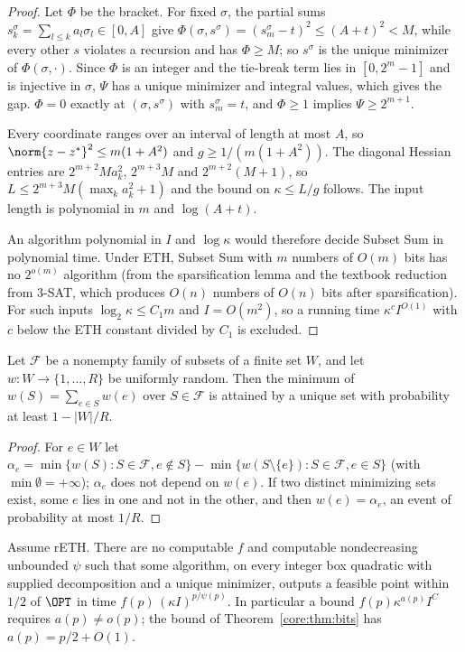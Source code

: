 \begin{proof}
Let $\Phi$ be the bracket. For fixed $\sigma$, the partial sums
$s^\sigma_k=\sum_{l\le k}a_l\sigma_l\in[0,A]$ give
$\Phi(\sigma,s^\sigma)=(s^\sigma_m-t)^2\le(A+t)^2<M$, while every other $s$
violates a recursion and has $\Phi\ge M$; so $s^\sigma$ is the unique minimizer
of $\Phi(\sigma,\cdot)$. Since $\Phi$ is an integer and the tie-break term lies
in $[0,2^m-1]$ and is injective in $\sigma$, $\Psi$ has a unique minimizer and
integral values, which gives the gap. $\Phi=0$ exactly at $(\sigma,s^\sigma)$
with $s^\sigma_m=t$, and $\Phi\ge1$ implies $\Psi\ge2^{m+1}$.

Every coordinate ranges over an interval of length at most $A$, so
$\norm{z-z^*}^2\le m(1+A^2)$ and $g\ge1/(m(1+A^2))$. The diagonal Hessian
entries are $2^{m+2}Ma_k^2$, $2^{m+3}M$ and $2^{m+2}(M+1)$, so
$L\le2^{m+3}M(\max_ka_k^2+1)$ and the bound on $\kappa\le L/g$ follows. The
input length is polynomial in $m$ and $\log(A+t)$.

An algorithm polynomial in $I$ and $\log\kappa$ would therefore decide Subset
Sum in polynomial time. Under ETH, Subset Sum with $m$ numbers of $O(m)$ bits
has no $2^{o(m)}$ algorithm (from the sparsification lemma
\cite{ImpagliazzoPaturiZane2001} and the textbook reduction from 3-SAT, which
produces $O(n)$ numbers of $O(n)$ bits after sparsification). For such inputs
$\log_2\kappa\le C_1m$ and $I=O(m^2)$, so a running time $\kappa^cI^{O(1)}$
with $c$ below the ETH constant divided by $C_1$ is excluded.
\end{proof}

\begin{lemma}\label{core:lem:isolation}
Let $\mathcal F$ be a nonempty family of subsets of a finite set $W$, and let
$w:W\to\{1,\dots,R\}$ be uniformly random. Then the minimum of
$w(S)=\sum_{e\in S}w(e)$ over $S\in\mathcal F$ is attained by a unique set with
probability at least $1-|W|/R$.
\end{lemma}

\begin{proof}
For $e\in W$ let $\alpha_e=\min\{w(S):S\in\mathcal F,e\notin S\}
-\min\{w(S\setminus\{e\}):S\in\mathcal F,e\in S\}$ (with
$\min\emptyset=+\infty$); $\alpha_e$ does not depend on $w(e)$. If two
distinct minimizing sets exist, some $e$ lies in one and not in the other,
and then $w(e)=\alpha_e$, an event of probability at most $1/R$.
\end{proof}

\begin{proposition}
\label{core:prop:lbproduct}
Assume rETH. There are no computable $f$ and computable nondecreasing
unbounded $\psi$ such that some algorithm, on every integer box quadratic with
supplied decomposition and a unique minimizer, outputs a feasible point within
$1/2$ of $\OPT$ in time $f(p)\,(\kappa I)^{p/\psi(p)}$. In particular a bound
$f(p)\kappa^{a(p)}I^{C}$ requires $a(p)\ne o(p)$; the bound of
Theorem~\ref{core:thm:bits} has $a(p)=p/2+O(1)$.
\end{proposition}

